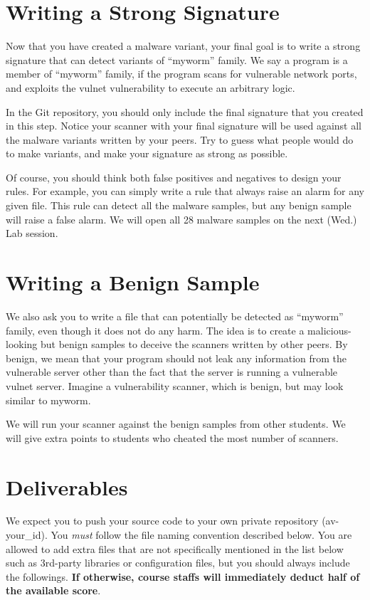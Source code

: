 \documentclass[a4paper, 11pt]{article}
\theoremstyle{definition}
\begin{document}
{\section{Writing a Strong Signature}

Now that you have created a malware variant, your final goal is to
write a strong signature that can detect variants of ``myworm''
family. We say a program is a member of ``myworm'' family, if the
program scans for vulnerable network ports, and exploits the vulnet
vulnerability to execute an arbitrary logic.

In the Git repository, you should only include the final signature
that you created in this step. Notice your scanner with your final
signature will be used against all the malware variants written by
your peers. Try to guess what people would do to make variants, and
make your signature as strong as possible.

Of course, you should think both false positives and negatives to
design your rules. For example, you can simply write a rule that
always raise an alarm for any given file. This rule can detect all the
malware samples, but any benign sample will raise a false alarm. We
will open all 28 malware samples on the next (Wed.) Lab session.

\section{Writing a Benign Sample}

We also ask you to write a file that can potentially be detected as
``myworm'' family, even though it does not do any harm. The idea is to
create a malicious-looking but benign samples to deceive the scanners
written by other peers. By benign, we mean that your program should
not leak any information from the vulnerable server other than the
fact that the server is running a vulnerable vulnet server. Imagine a
vulnerability scanner, which is benign, but may look similar to
myworm.

We will run your scanner against the benign samples from other
students. We will give extra points to students who cheated the most
number of scanners.

\section{Deliverables}

We expect you to push your source code to your own private repository
(av-your\_id). You \emph{must} follow the file naming convention
described below. You are allowed to add extra files that are not
specifically mentioned in the list below such as 3rd-party libraries
or configuration files, but you should always include the followings.
\textbf{If otherwise, course staffs will immediately deduct half of
the available score}.

}
\end{document}
